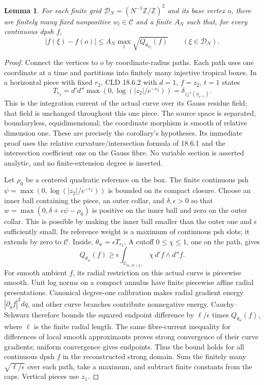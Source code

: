 \documentclass[11pt]{article}
\newcommand{\DD}{d'd''}
\newcommand{\C}{\mathcal C}
\newtheorem{lemma}[theorem]{Lemma}
\theoremstyle{remark}\newtheorem{remark}[theorem]{Remark}
\begin{document}
\begin{lemma}\label{paths}
For each finite grid $\mathscr D_N=(N^{-1}\mathbb Z/\mathbb Z)^2$
and its base vertex $o$, there are finitely many fixed nonpositive
$w_l\in\C$ and a finite $A_N$ such that, for every continuous dpsh $f$,
\[
 |f(\xi)-f(o)|\le A_N\max_l\sqrt{Q_{\theta_{w_l}}(f)}
 \qquad(\xi\in\mathscr D_N).
\]
\end{lemma}
\begin{proof}
Connect the vertices to $o$ by coordinate-radius paths. Each path
uses one coordinate at a time and partitions into finitely many
injective tropical boxes. In a horizontal piece with fixed $r_2$,
CLD 18.6.2 with $d=1$, $f=z_2$, $t=1$ states
\[
 T_{r_2}=\DD\max(0,\log(|z_2|/e^{-r_2}))
 =\delta_{z_2^{-1}(\eta_{e^{-r_2}})}.
\]
This is the integration current of the actual curve over its Gauss
residue field; that field is unchanged throughout this one piece.
The source space is separated, boundaryless, equidimensional; the
coordinate morphism is smooth of relative dimension one. These are
precisely the corollary's hypotheses. Its immediate proof uses the
relative curvature/intersection formula of 18.6.1 and the intersection
coefficient one on the Gauss fibre. No variable section is asserted
analytic, and no finite-extension degree is inserted.

Let $\rho_0$ be a centered quadratic reference on the box.
The finite continuous psh $\psi=\max(0,\log(|z_2|/e^{-r_2}))$
is bounded on its compact closure. Choose an inner ball containing
the piece, an outer collar, and $\delta,\epsilon>0$ so that
$w=\max(0,\delta+\epsilon\psi-\rho_0)$ is positive on the inner
ball and zero on the outer collar. This is possible by making the
inner ball smaller than the outer one and $\epsilon$ sufficiently
small. Its reference weight is a maximum of continuous psh slots;
it extends by zero to $\C$. Inside, $\theta_w=\epsilon T_{r_2}$.
A cutoff $0\le\chi\le1$, one on the path, gives
\[
 Q_{\theta_w}(f)\ge\epsilon\int_{\mathbb G_{m,\mathscr H(\eta)}}
          \chi\,d'f\wedge d''f.
\]
For smooth ambient $f$, its radial restriction on this actual curve
is piecewise smooth. Unit log norms on a compact annulus have finite
piecewise affine radial presentations. Canonical degree-one calibration
makes radial gradient energy $|\partial_q f|^2dq$, and other curve
branches contribute nonnegative energy. Cauchy--Schwarz therefore
bounds the squared endpoint difference by $\ell/\epsilon$ times
$Q_{\theta_w}(f)$, where $\ell$ is the finite radial length.
The same fibre-current inequality for differences of local smooth
approximants proves strong convergence of their curve gradients;
uniform convergence gives endpoints. Thus the bound holds for all
continuous dpsh $f$ in the reconstructed strong domain. Sum the
finitely many $\sqrt{\ell/\epsilon}$ over each path, take a maximum,
and subtract finite constants from the caps. Vertical pieces use $z_1$.
\end{proof}
\end{document}
